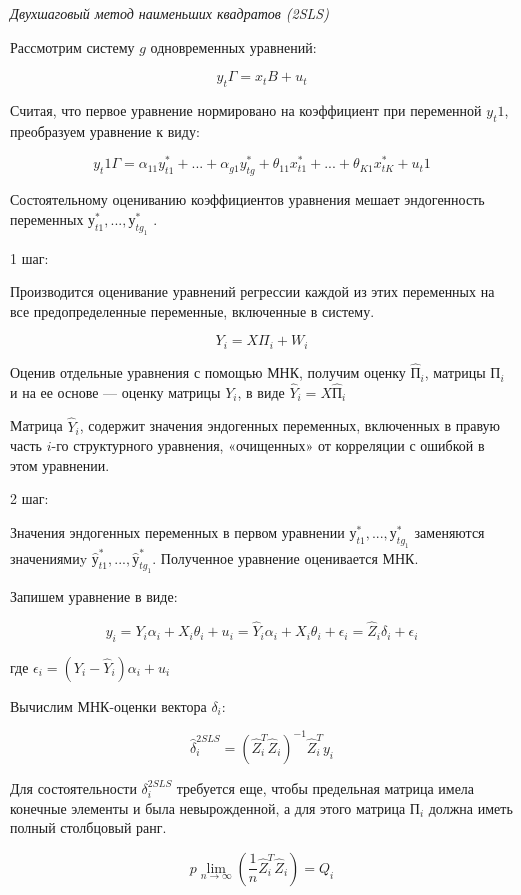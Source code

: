 \documentclass[a4paper,8pt]{article} %
\begin{document}
\textit{Двухшаговый метод наименьших квадратов (2SLS)}

Рассмотрим систему $g$ одновременных уравнений:

$$y_t \Gamma = x_t B + u_t$$ 

Считая, что первое уравнение нормировано на коэффициент при переменной $y_t1$, преобразуем уравнение к виду:

$$y_t1 \Gamma = \alpha_{11} y_{t1}^* + ... + \alpha_{g1}  y_{tg}^*  +    \theta_{11} x_{t1}^*  + ... + \theta_{K1} x_{tK}^*   + u_t1$$ 


Состоятельному оцениванию коэффициентов уравнения мешает эндогенность переменных $у^*_{t1}, ..., у^*_{tg_1} $ . 

1 шаг:


Производится оценивание уравнений регрессии каждой из этих переменных на все предопределенные переменные, включенные в систему.

$$Y_i = X \Pi_i + W_i$$ 

Оценив отдельные уравнения с помощью МНК, получим
оценку $\hat{П}_i $, матрицы ${П}_i $  и на ее основе — оценку матрицы $Y_i$, в виде $\hat{Y}_i = X \hat{П}_i  $

Матрица $\hat{Y}_i$, содержит значения эндогенных переменных, включенных в правую часть $i$-го структурного уравнения, «очищенных» от корреляции с ошибкой в этом уравнении.


2 шаг:

Значения эндогенных переменных в первом уравнении  $у^*_{t1}, ..., у^*_{tg_1} $  заменяются значениямиy  $\hat{у}^*_{t1}, ..., \hat{у}^*_{tg_1} $. Полученное уравнение оценивается МНК.

Запишем уравнение в виде:

$$y_i = Y_i \alpha_i + X_i \theta_i +u_i = \hat{Y}_i    \alpha_i + X_i \theta_i +  \epsilon_i = \hat{Z}_i \delta_i +  \epsilon_i $$

где $ \epsilon_i = ( Y_i - \hat{Y}_i  )  \alpha_i  +   u_i $


Вычислим МНК-оценки  вектора $\delta_i $: 

$$ \hat{\delta}_i^{2SLS} = (\hat{Z}_i^T \hat{Z}_i )^{-1} \hat{Z}_i^T y_i $$ 


Для состоятельности  $ \delta_i^{2SLS}$ требуется еще, чтобы предельная матрица имела конечные элементы и была невырожденной, а для этого матрица $П_i$  должна иметь полный столбцовый ранг. 

$$ p \lim_{n\to \infty} (\frac{1}{n} \hat{Z}_i^T \hat{Z}_i ) = Q_i $$ 
\end{document}
